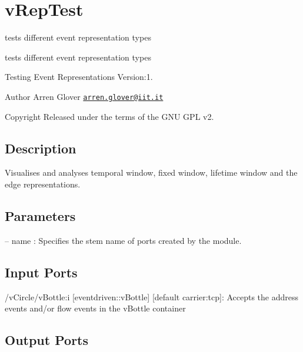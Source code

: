 \hypertarget{group__vRepTest}{}\section{v\+Rep\+Test}
\label{group__vRepTest}


tests different event representation types  


tests different event representation types 

Testing Event Representations Version\+:1. \begin{DoxyAuthor}{Author}
Arren Glover \href{mailto:arren.glover@iit.it}{\tt arren.\+glover@iit.\+it} ~\newline
 
\end{DoxyAuthor}
\begin{DoxyCopyright}{Copyright}
Released under the terms of the G\+NU G\+PL v2. 
\end{DoxyCopyright}
\hypertarget{group__vUndistortCam_intro_sec}{}\subsection{Description}\label{group__vUndistortCam_intro_sec}
Visualises and analyses temporal window, fixed window, lifetime window and the edge representations.\hypertarget{group__vUndistortCam_parameters_sec}{}\subsection{Parameters}\label{group__vUndistortCam_parameters_sec}

\begin{DoxyItemize}
\item -- name \+: Specifies the stem name of ports created by the module. 
\end{DoxyItemize}\hypertarget{group__vUndistortCam_inputports_sec}{}\subsection{Input Ports}\label{group__vUndistortCam_inputports_sec}

\begin{DoxyItemize}
\item /v\+Circle/v\+Bottle\+:i \mbox{[}eventdriven\+::v\+Bottle\mbox{]} \mbox{[}default carrier\+:tcp\mbox{]}\+: Accepts the address events and/or flow events in the v\+Bottle container
\end{DoxyItemize}\hypertarget{group__vUndistortCam_outputports_sec}{}\subsection{Output Ports}\label{group__vUndistortCam_outputports_sec}


